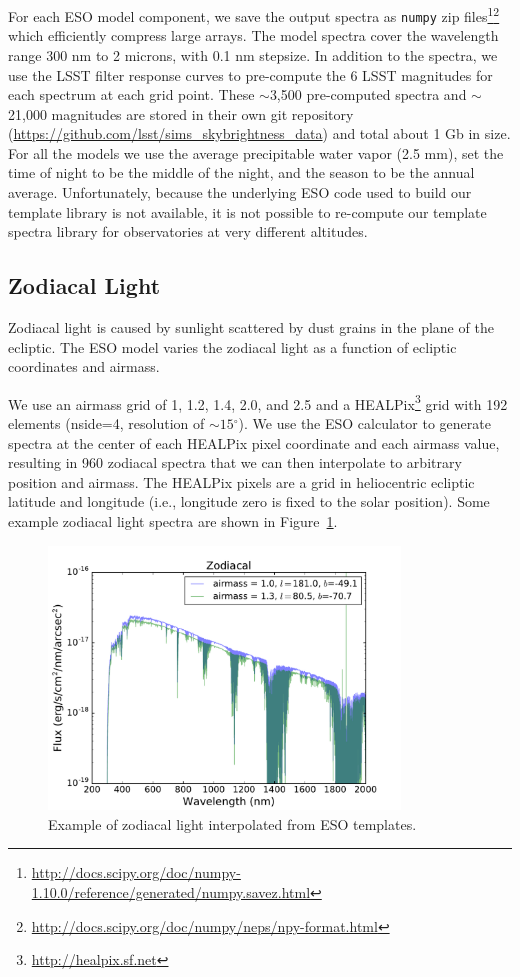 \documentclass[]{spie}
\newcommand\degree{{^\circ}}
\begin{document}
For each ESO model component, we save the output spectra as \texttt{numpy} zip files\footnote{\url{http://docs.scipy.org/doc/numpy-1.10.0/reference/generated/numpy.savez.html}}\footnote{\url{http://docs.scipy.org/doc/numpy/neps/npy-format.html}} which efficiently compress large arrays.  The model spectra cover the wavelength range 300 nm to 2 microns, with 0.1 nm stepsize.  In addition to the spectra, we use the LSST filter response curves to pre-compute the 6 LSST magnitudes for each spectrum at each grid point. These $\sim$3,500 pre-computed spectra and $\sim$21,000 magnitudes are stored in their own git repository (\url{https://github.com/lsst/sims\_skybrightness\_data}) and total about 1 Gb in size. For all the models we use the average precipitable water vapor (2.5 mm), set the time of night to be the middle of the night, and the season to be the annual average. Unfortunately, because the underlying ESO code used to build our template library is not available, it is not possible to re-compute our template spectra library for observatories at very different altitudes.  

\subsection{Zodiacal Light}

Zodiacal light is caused by sunlight scattered by dust grains in the plane of the ecliptic.  The ESO model varies the zodiacal light as a function of ecliptic coordinates and airmass.  

We use an airmass grid of 1, 1.2, 1.4, 2.0, and 2.5 and a HEALPix\footnote{\url{http://healpix.sf.net}} \cite{Gorski99} grid with 192 elements (nside=4, resolution of $\sim15\degree$).  We use the ESO calculator to generate spectra at the center of each HEALPix pixel coordinate and each airmass value, resulting in 960 zodiacal spectra that we can then interpolate to arbitrary position and airmass.  The HEALPix pixels are a grid in heliocentric ecliptic latitude and longitude (i.e., longitude zero is fixed to the solar position).  Some example zodiacal light spectra are shown in Figure~\ref{fig:zodiacal}. 


\begin{figure}[ht]
  \begin{center}
  \includegraphics[height=7cm]{plots/zodiacal.pdf}
  \end{center}
  \caption{Example of zodiacal light interpolated from ESO templates. \label{fig:zodiacal}}
\end{figure}
\end{document}
